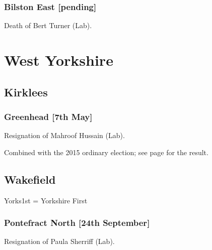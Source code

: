 \documentclass[a4paper,openany]{book}
\begin{document}
\begin{resultsiii}
\subsubsection*{Bilston East \hspace*{\fill}\nolinebreak[1]%
\enspace\hspace*{\fill}
[pending]}


Death of Bert Turner (Lab).

\section{West Yorkshire}

\subsection*{Kirklees}

\subsubsection*{Greenhead \hspace*{\fill}\nolinebreak[1]%
\enspace\hspace*{\fill}
[7th May]}


Resignation of Mahroof Hussain (Lab).

Combined with the 2015 ordinary election; see page \pageref{GreenheadKirklees} for the result.

\subsection*{Wakefield}

Yorks1st = Yorkshire First

\subsubsection*{Pontefract North \hspace*{\fill}\nolinebreak[1]%
\enspace\hspace*{\fill}
[24th September]}


Resignation of Paula Sherriff (Lab).


\end{resultsiii}
\end{document}
